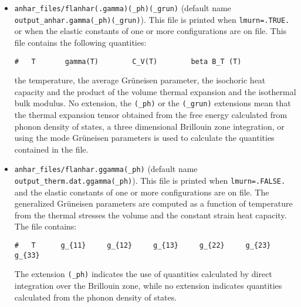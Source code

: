 \documentclass[12pt,a4paper]{article}
\begin{document}
\begin{itemize}
\item 
\texttt{anhar\_files/flanhar(.gamma)(\_ph)(\_grun)} 
(default name \\ \texttt{output\_anhar.gamma(\_ph)(\_grun)}). 
This file is printed
when \texttt{lmurn=.TRUE.} or when the elastic
constants of one or more configurations are on file.
This file contains the following quantities:
\begin{verbatim}
#   T       gamma(T)        C_V(T)        beta B_T (T)    
\end{verbatim}
the temperature, the average Gr\"uneisen parameter, the isochoric
heat capacity and the product of the volume thermal expansion and the
isothermal bulk modulus.
No extension, the \texttt{(\_ph)} or the \texttt{(\_grun)}
extensions mean that the thermal expansion tensor obtained from the
free energy calculated from phonon density of states,
a three dimensional Brillouin zone integration, or using the
mode Gr\"uneisen parameters is used to calculate the quantities 
contained in the file.

\item
\texttt{anhar\_files/flanhar.ggamma(\_ph)} (default name
\texttt{output\_therm.dat.ggamma(\_ph)}).
This file is printed when \texttt{lmurn=.FALSE.} and the elastic constants 
of one or more configurations are on file.
The generalized Gr\"uneisen parameters are computed as a function of 
temperature from the thermal stresses the volume and the 
constant strain heat capacity.
The file contains:
\begin{verbatim}
#   T      g_{11}     g_{12}     g_{13}     g_{22}     g_{23}     g_{33}
\end{verbatim}
The extension \texttt{(\_ph)} indicates the use of quantities 
calculated by direct integration over the Brillouin zone,
while no extension indicates quantities calculated from the phonon 
density of states.


\end{itemize}
\end{document}
